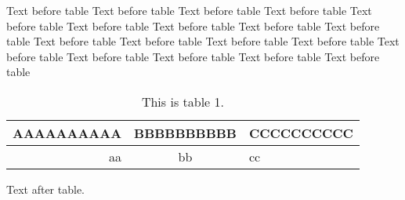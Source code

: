 \documentclass{article}
\begin{document}
Text before table Text before table Text before table Text before table Text before table Text before table Text before table Text before table Text before table Text before table Text before table Text before table Text before table Text before table Text before table Text before table Text before table Text before table \newline
\begin{table}[h!]
\centering
\begin{tabular}{|r|c|l|} %
\hline
AAAAAAAAAA & BBBBBBBBBB & CCCCCCCCCC\\\hline\hline
aa & bb & cc
\end{tabular}
\caption{This is table 1.}
\end{table}



Text after table.
\end{document}
